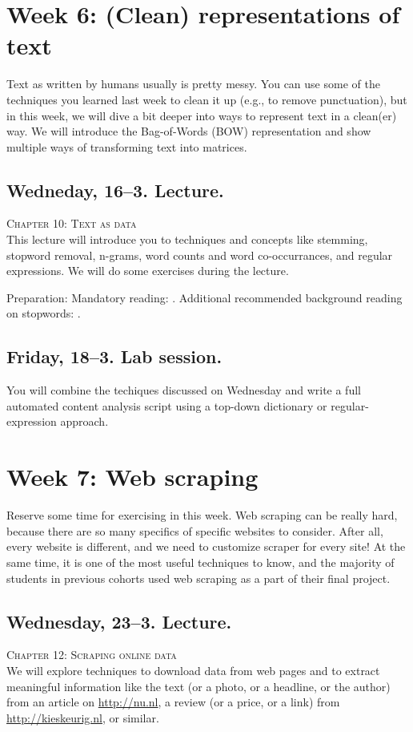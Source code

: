 \section*{Week 6: (Clean) representations of text}
Text as written by humans usually is pretty messy. You can use some of the techniques you learned last week to clean it up (e.g., to remove punctuation), but in this week, we will dive a bit deeper into ways to represent text in a clean(er) way. We will introduce the Bag-of-Words (BOW) representation and show multiple ways of transforming text into matrices.



\subsection*{Wedneday, 16--3. Lecture.}
\textsc{ Chapter 10: Text as data}\\
This lecture will introduce you to techniques and concepts like stemming, stopword removal, n-grams, word counts and word co-occurrances, and regular expressions. We will do some exercises during the lecture.

Preparation: Mandatory reading: \cite{Boumans2016}. Additional recommended background reading on stopwords: \cite{Nothman2018}.


\subsection*{Friday, 18--3. Lab session.}
You will combine the techiques discussed on Wednesday and write a full automated content analysis script using a top-down dictionary or regular-expression approach.





\section*{Week 7: Web scraping}
Reserve some time for exercising in this week. Web scraping can be really hard, because there are so many specifics of specific websites to consider. After all, every website is different, and we need to customize scraper for every site! At the same time, it is one of the most useful techniques to know, and the majority of students in previous cohorts used web scraping as a part of their final project.

\subsection*{Wednesday, 23--3. Lecture.}
\textsc{ Chapter 12: Scraping online data}\\
We will explore techniques to download data from web pages and to extract meaningful information like the text (or a photo, or a headline, or the author) from an article on \url{http://nu.nl}, a review (or a price, or a link) from \url{http://kieskeurig.nl}, or similar.

